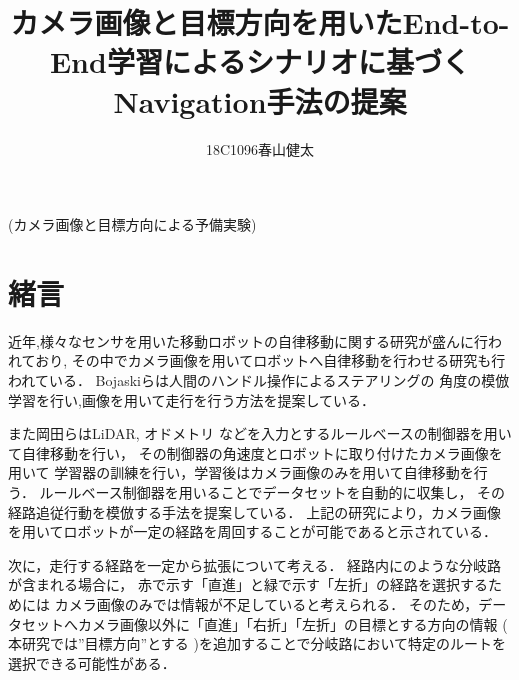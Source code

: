 \documentclass[10pt]{jarticle}
\begin{document}
    
    \makeatletter
  \title{カメラ画像と目標方向を用いたEnd-to-End学習によるシナリオに基づくNavigation手法の提案}{(カメラ画像と目標方向による予備実験)}
    
    \author{18C1096\hspace{.5zw}春山健太}
    
    \makeatother
    
    
    
    \maketitle
    
    
    \section{緒\hspace{2zw}言}%
    近年,様々なセンサを用いた移動ロボットの自律移動に関する研究が盛んに行われており,
    その中でカメラ画像を用いてロボットへ自律移動を行わせる研究も行われている．
    Bojaskiら\cite{nvidia}は人間のハンドル操作によるステアリングの
    角度の模倣学習を行い,画像を用いて走行を行う方法を提案している．

    また岡田ら\cite{okada}はLiDAR, オドメトリ
    などを入力とするルールべースの制御器を用いて自律移動を行い，
    その制御器の角速度とロボットに取り付けたカメラ画像を用いて
    学習器の訓練を行い，学習後はカメラ画像のみを用いて自律移動を行う．
    ルールベース制御器を用いることでデータセットを自動的に収集し，
    その経路追従行動を模倣する手法を提案している．
    上記の研究により，カメラ画像を用いてロボットが一定の経路を周回することが可能であると示されている．
    
    次に，走行する経路を一定から拡張について考える．
    経路内にのような分岐路が含まれる場合に，
    赤で示す「直進」と緑で示す「左折」の経路を選択するためには
    カメラ画像のみでは情報が不足していると考えられる．
    そのため，データセットへカメラ画像以外に「直進」「右折」「左折」の目標とする方向の情報
     ( 本研究では”目標方向”とする )を追加することで分岐路において特定のルートを選択できる可能性がある．
\end{document}
